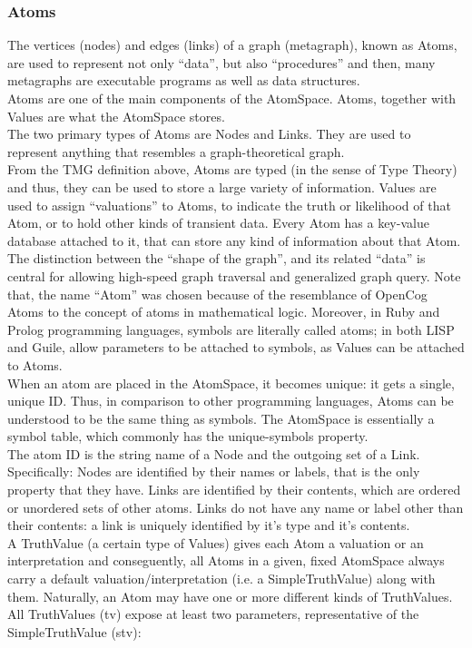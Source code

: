 \subsubsection{Atoms}\label{sec:atoms}

The vertices (nodes) and edges (links) of a graph (metagraph), known as Atoms, are used to represent not only \enquote{data}, but also \enquote{procedures} and then, many metagraphs are executable programs as well as data structures. \\
Atoms are one of the main components of the AtomSpace. Atoms, together with Values are what the AtomSpace stores.  \\
The two primary types of Atoms are Nodes and Links. They are used to represent anything that resembles a graph-theoretical graph. \\
From the TMG definition above, Atoms are typed (in the sense of Type Theory) and thus, they can be used to store a large variety of information. 
Values are used to assign \enquote{valuations} to Atoms, to indicate the truth or likelihood of that Atom, or to hold other kinds of transient data. Every Atom has a key-value database attached to it, that can store any kind of information about that Atom. The distinction between the \enquote{shape of the graph}, and its related \enquote{data} is central for allowing high-speed graph traversal and generalized graph query. Note that, the name \enquote{Atom} was chosen because of the resemblance of OpenCog Atoms to the concept of atoms in mathematical logic. Moreover, in Ruby and Prolog programming languages, symbols are literally called atoms; in both LISP and Guile, allow parameters to be attached to symbols, as Values can be attached to Atoms. \\

When an atom are placed in the AtomSpace, it becomes unique: it gets a single, unique ID. Thus, in comparison to other programming languages\footnotemark{}, Atoms can be understood to be the same thing as symbols. The AtomSpace is essentially a symbol table, which commonly has the unique-symbols property. \\
The atom ID is the string name of a Node and the outgoing set of a Link. Specifically: Nodes are identified by their names or labels, that is the only property that they have. Links are identified by their contents, which are ordered or unordered sets of other atoms. Links do not have any name or label other than their contents: a link is uniquely identified by it's type and it's contents.\\
A TruthValue (a certain type of Values) gives each Atom a valuation or an interpretation and conseguently, all Atoms in a given, fixed AtomSpace always carry a default valuation/interpretation (i.e. a SimpleTruthValue) along with them. Naturally, an Atom may have one or more different kinds of TruthValues. \\
All TruthValues (tv) expose at least two parameters, representative of the SimpleTruthValue (stv):

